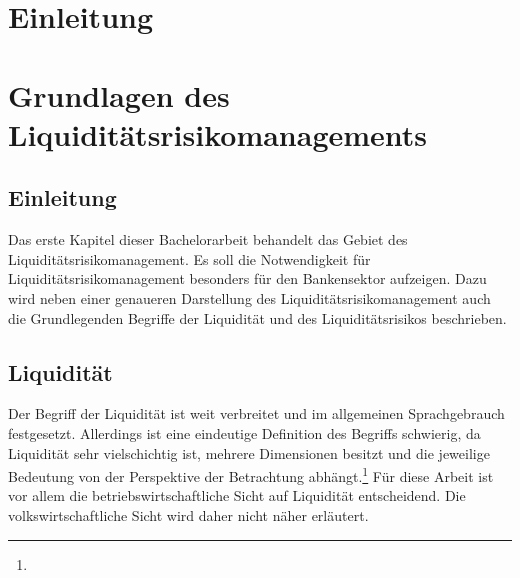 \begin{onehalfspacing}

\chapter{Einleitung}

\loreIpsum

\loreIpsum

\loreIpsum

\loreIpsum




\chapter{Grundlagen des Liquiditätsrisikomanagements} 

\section{Einleitung}
Das erste Kapitel dieser Bachelorarbeit behandelt das Gebiet des Liquiditätsrisikomanagement. Es soll die Notwendigkeit für Liquiditätsrisikomanagement besonders für den Bankensektor aufzeigen. Dazu wird neben einer genaueren Darstellung des Liquiditätsrisikomanagement auch die Grundlegenden Begriffe der Liquidität und des Liquiditätsrisikos beschrieben.

\section{Liquidität} 
Der Begriff der Liquidität ist weit verbreitet und im allgemeinen Sprachgebrauch festgesetzt. Allerdings ist eine eindeutige Definition des Begriffs schwierig, da Liquidität sehr vielschichtig ist, mehrere Dimensionen besitzt und die jeweilige Bedeutung von der Perspektive der Betrachtung abhängt.\footnote{ } Für diese Arbeit ist vor allem die betriebswirtschaftliche Sicht auf Liquidität entscheidend. Die volkswirtschaftliche Sicht wird daher nicht näher erläutert.


\end{onehalfspacing}
